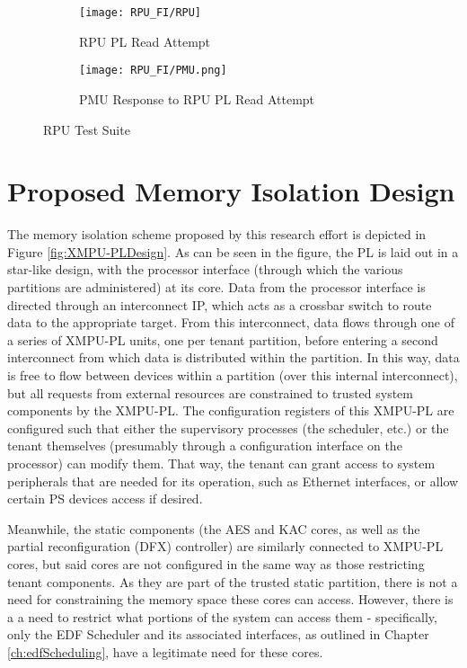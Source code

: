 \begin{figure}[H]
    \centering
    \begin{subfigure}[b]{0.8\textwidth}
        \texttt{[image: RPU\_FI/RPU]}
        \caption{RPU PL Read Attempt}
        \label{subfig:RPU_PLRead}
    \end{subfigure}
    \begin{subfigure}[b]{0.8\textwidth}
        \texttt{[image: RPU\_FI/PMU.png]}
        \caption{PMU Response to RPU PL Read Attempt}
        \label{subfig:RPU_PMU_Response}
    \end{subfigure}
    \caption{RPU Test Suite}
    \label{fig:RPU_Test_Suite}
\end{figure}

\section{Proposed Memory Isolation Design}\label{sec:DMADesign}

The memory isolation scheme proposed by this research effort is depicted in Figure \ref{fig:XMPU-PLDesign}. As can be seen in the figure, the PL is laid out in a star-like design, with the processor interface (through which the various partitions are administered) at its core. Data from the processor interface is directed through an interconnect IP, which acts as a crossbar switch to route data to the appropriate target. From this interconnect, data flows through one of a series of XMPU-PL units, one per tenant partition, before entering a second interconnect from which data is distributed within the partition. In this way, data is free to flow between devices within a partition (over this internal interconnect), but all requests from external resources are constrained to trusted system components by the XMPU-PL. The configuration registers of this XMPU-PL are configured such that either the supervisory processes (the scheduler, etc.) or the tenant themselves (presumably through a configuration interface on the processor) can modify them. That way, the tenant can grant access to system peripherals that are needed for its operation, such as Ethernet interfaces, or allow certain PS devices access if desired.

Meanwhile, the static components (the AES and KAC cores, as well as the partial reconfiguration (DFX) controller) are similarly connected to XMPU-PL cores, but said cores are not configured in the same way as those restricting tenant components. As they are part of the trusted static partition, there is not a need for constraining the memory space these cores can access. However, there is a a need to restrict what portions of the system can access them - specifically, only the EDF Scheduler and its associated interfaces, as outlined in Chapter \ref{ch:edfScheduling}, have a legitimate need for these cores. 

